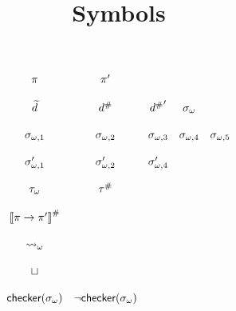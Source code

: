 \documentclass[sigplan,10pt,anonymous]{acmart}\settopmatter{printfolios=true,printccs=false,printacmref=false}
\begin{document}
\title{Symbols}

\[
  \begin{array}{cccccc}
    \pi & \pi'\\\\
    \widetilde{d} & {d}^{\#} & {{d}^{\#}}' & {\sigma}_\omega\\\\
    \sigma_{\omega,1} & \sigma_{\omega,2} & \sigma_{\omega,3} & \sigma_{\omega,4} & \sigma_{\omega,5}\\\\
    \sigma_{\omega,1}' & \sigma_{\omega,2}' & \sigma_{\omega,4}'\\\\
    {\tau}_\omega & {\tau}^{\#}\\\\
    {\llbracket \pi \rightarrow \pi' \rrbracket}^{\#}\\\\
    {\leadsto}_\omega\\\\
    \sqcup\\\\
    \textsf{checker}({\sigma}_\omega) & \neg \textsf{checker}({\sigma}_\omega)\\\\
  \end{array}
\]
\end{document}
